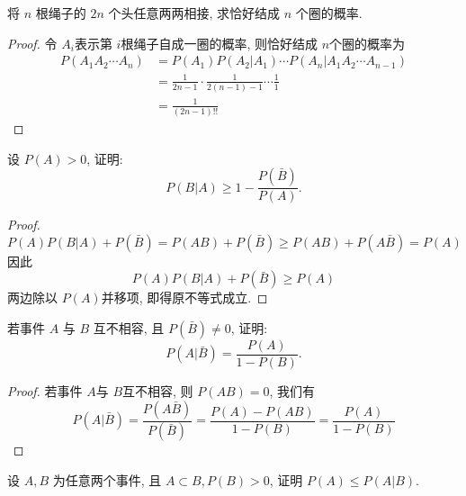 \documentclass[../main.tex]{subfiles}
\begin{document}
\begin{exercise}{}{}
将 $n$ 根绳子的 $2n$ 个头任意两两相接, 求恰好结成 $n$ 个圈的概率.
\end{exercise}

\begin{proof}
  令 \(  A_{i}  \)表示第 \(  i  \)根绳子自成一圈的概率, 则恰好结成 \(  n  \)个圈的概率为 \[
 \begin{aligned}
  P\left( A_1A_2\cdots A_{n} \right)&= P\left( A_1 \right)P\left( A_2|A_1 \right)\cdots P\left( A_{n} |A_1A_2\cdots A_{n-1}\right)    \\ 
   &= \frac{1 }{2n-1 }\cdot \frac{1 }{2\left( n-1 \right)-1  }\cdots \frac{1 }{1 }\\ 
    &= \frac{1 }{\left( 2n-1 \right)!!  }    
 \end{aligned}
  \]   
\end{proof}

\begin{exercise}{}{}
    设 $P(A)>0$, 证明:
$$P(B|A) \ge 1 - \frac{P(\bar{B})}{P(A)}.$$
\end{exercise}

\begin{proof}
     \[
     P\left( A \right)P\left( B|A \right)+ P\left( \bar{B} \right)= P\left( AB \right)+ P\left( \bar{B} \right)\ge P\left( AB \right)+ P\left( A \bar{B} \right)= P\left( A \right)        
     \]因此 \[
     P\left( A \right)P\left( B|A \right)+ P\left( \bar{B} \right)\ge P\left( A \right)    
     \]两边除以 \(  P\left( A \right)   \)并移项, 即得原不等式成立. 
\end{proof}

\begin{exercise}{}{}
    若事件 $A$ 与 $B$ 互不相容, 且 $P(\bar{B}) \ne 0$, 证明:
$$P(A|\bar{B}) = \frac{P(A)}{1-P(B)}.$$
\end{exercise}

\begin{proof}
    若事件 \(  A  \)与 \(  B  \)互不相容, 则 \(  P\left( AB \right)= 0   \), 我们有 \[
    P\left( A|\bar{B} \right)= \frac{P\left( A \bar{B} \right)  }{P\left( \bar{B} \right)  }= \frac{P\left( A \right)-P\left( AB \right)   }{1-P\left( B \right)  }= \frac{P\left( A \right)  }{1-P\left( B \right)  }    
    \]   
\end{proof}

\begin{exercise}{}{}
    设 $A, B$ 为任意两个事件, 且 $A \subset B, P(B)>0$, 证明 $P(A) \le P(A|B)$.
\end{exercise}
\end{document}
